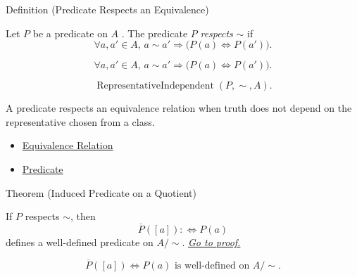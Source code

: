 \begin{definitionbox}{Definition (Predicate Respects an Equivalence)}
\begin{definition}
\label{def:predicate-respects-equivalence}
Let $P$ be a predicate on $A$
. The predicate $P$ \emph{respects} $\sim$ if
\[
\forall a,a'\in A,\,
a\sim a'\Longrightarrow \bigl(P(a)\Longleftrightarrow P(a')\bigr).
\]
\end{definition}
\end{definitionbox}

\begin{remark*}
\[
\forall a,a'\in A,\,
a\sim a'\Longrightarrow \bigl(P(a)\Longleftrightarrow P(a')\bigr).
\]
\end{remark*}

\begin{remark*}
\[
\operatorname{RepresentativeIndependent}(P,\sim,A).
\]
\end{remark*}

\begin{remark*}[Interpretation]
A predicate respects an equivalence relation when truth does not depend on the
representative chosen from a class.
\end{remark*}

\begin{dependencies}
\begin{itemize}
  \item \hyperref[def:equivalence-relation]{Equivalence Relation}
  \item \hyperref[def:predicate]{Predicate}
\end{itemize}
\end{dependencies}

\begin{theorembox}{Theorem (Induced Predicate on a Quotient)}
\begin{theorem}
\label{thm:induced-predicate-on-quotient}
If $P$ respects $\sim$, then
\[
\overline{P}([a]):\Longleftrightarrow P(a)
\]
defines a well-defined predicate on $A/{\sim}$.
\hyperref[prf:induced-predicate-on-quotient]{\textit{Go to proof.}}
\end{theorem}
\end{theorembox}

\begin{remark*}
\[
\overline{P}([a])\Longleftrightarrow P(a)
\text{ is well-defined on } A/{\sim}.
\]
\end{remark*}

